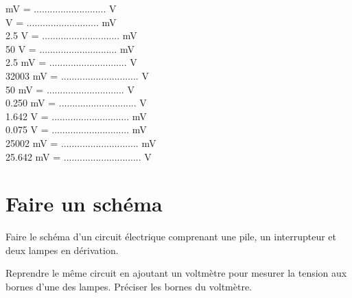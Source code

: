 \documentclass[a4paper,11pt]{exam}
\begin{document}
\begin{multicols}{2}
	\begin{questions}
		 mV = ........................... V \\
		
		 V = ........................... mV \\
		
		\question \num{2.5} V = ............................. mV \\
		
		\question \num{50} V = ............................. mV \\
		
		\question \num{2.5} mV = ............................. V\\
		
		\question \num{32003} mV = ............................. V	\\
		
		\question \num{50} mV = ............................. V\\
				
		\question \num{0.250} mV = ............................. V\\
		
		
		\question \num{1.642} V = ............................. mV\\
		
		\question \num{0.075} V = ............................. mV	\\
		
		\question \num{25002} mV = ............................. mV	\\
		
		
		\question \num{25.642} mV = ............................. V\\
	\end{questions}
	
\end{multicols}

\newpage


\section{Faire un schéma}
 
 \begin{questions}
 	\question Faire le schéma d'un circuit électrique comprenant une pile, un interrupteur et deux lampes en dérivation.
 	
 	
 	\makeemptybox{7cm}
 	
 	
 	\question Reprendre le même circuit en ajoutant un voltmètre pour mesurer la tension aux bornes d'une des lampes. Préciser les bornes du voltmètre.
 	
 	\makeemptybox{7cm}
 \end{questions}
 
%
\ \label{LastPage}
\end{document}
